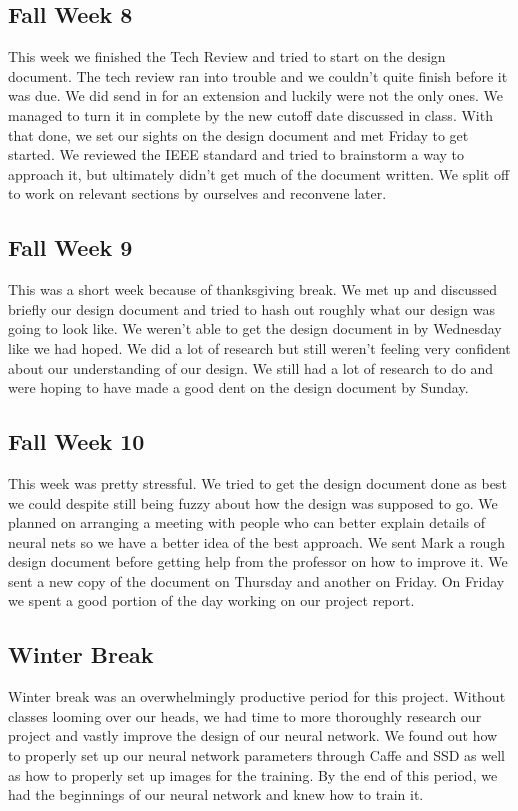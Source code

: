 \documentclass[onecolumn, draftclsnofoot,10pt, compsoc]{IEEEtran}
\begin{document}
\subsection{Fall Week 8}
This week we finished the Tech Review and tried to start on the design document.
The tech review ran into trouble and we couldn't quite finish before it was due.
We did send in for an extension and luckily were not the only ones.
We managed to turn it in complete by the new cutoff date discussed in class.
With that done, we set our sights on the design document and met Friday to get started.
We reviewed the IEEE standard and tried to brainstorm a way to approach it, but ultimately didn't get much of the document written.
We split off to work on relevant sections by ourselves and reconvene later.

\subsection{Fall Week 9}
This was a short week because of thanksgiving break.
We met up and discussed briefly our design document and tried to hash out roughly what our design was going to look like.
We weren't able to get the design document in by Wednesday like we had hoped.
We did a lot of research but still weren't feeling very confident about our understanding of our design.
We still had a lot of research to do and were hoping to have made a good dent on the design document by Sunday.

\subsection{Fall Week 10}
This week was pretty stressful.
We tried to get the design document done as best we could despite still being fuzzy about how the design was supposed to go.
We planned on arranging a meeting with people who can better explain details of neural nets so we have a better idea of the best approach.
We sent Mark a rough design document before getting help from the professor on how to improve it.
We sent a new copy of the document on Thursday and another on Friday.
On Friday we spent a good portion of the day working on our project report.

\subsection{Winter Break}
Winter break was an overwhelmingly productive period for this project.
Without classes looming over our heads, we had time to more thoroughly research our project and vastly improve the design of our neural network.
We found out how to properly set up our neural network parameters through Caffe and SSD as well as how to properly set up images for the training.
By the end of this period, we had the beginnings of our neural network and knew how to train it.
\end{document}
